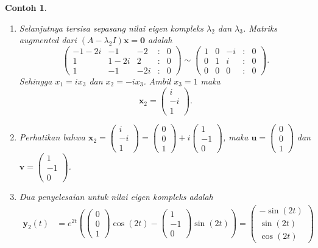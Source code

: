 \documentclass[a4paper]{article}
\theoremstyle{definisi}
\newtheorem{contoh}{Contoh}[section]
\numberwithin{equation}{section}
\begin{document}
\begin{contoh}
\begin{enumerate}[label=Langkah \arabic*: ,leftmargin=*]
      \item Selanjutnya tersisa sepasang nilai eigen kompleks $\lambda_2$ dan $\lambda_3$. Matriks \textit{augmented} dari $(A-\lambda_2I)\mathbf{x} = \mathbf{0}$ adalah
      \begin{equation*}
        \begin{pmatrix}
          -1-2i & -1 & -2 &:& 0\\
          1 & 1-2i & 2 &:& 0\\
          1 & -1 & -2i &:& 0
        \end{pmatrix} \sim \begin{pmatrix}
          1 & 0 & -i &:& 0\\
          0 & 1 & i &:& 0\\
          0 & 0 & 0 &:& 0
        \end{pmatrix}.
      \end{equation*}
      Sehingga $x_1 = ix_3$ dan $x_2 = -ix_3$. Ambil $x_3 = 1$ maka
      \[\mathbf{x}_2 = \begin{pmatrix}i\\-i\\1\end{pmatrix}.\]
      \item Perhatikan bahwa $\mathbf{x}_2 = \begin{pmatrix}i\\-i\\1\end{pmatrix}=\begin{pmatrix}0\\0\\1\end{pmatrix}+i\begin{pmatrix}1\\-1\\0\end{pmatrix}$, maka $\mathbf{u}= \begin{pmatrix}0\\0\\1\end{pmatrix}$ dan $\mathbf{v} = \begin{pmatrix}1\\-1\\0\end{pmatrix}$.
      \item Dua penyelesaian untuk nilai eigen kompleks adalah
      \begin{align*}
        \mathbf{y}_2(t) &= e^{2t}\left(\begin{pmatrix}0\\0\\1\end{pmatrix}\cos(2t) - \begin{pmatrix}1\\-1\\0\end{pmatrix}\sin(2t)\right)=\begin{pmatrix}-\sin(2t)\\\sin(2t)\\\cos(2t)\end{pmatrix}

\end{align*}
\end{enumerate}
\end{contoh}
\end{document}
